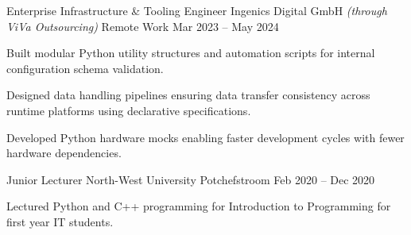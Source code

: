 \begin{cventries}
  \cventry
  {Enterprise Infrastructure \& Tooling Engineer}
  {Ingenics Digital GmbH \emph{(through ViVa Outsourcing)}}
  {Remote Work}
  {Mar 2023 -- May 2024}
  {
    \begin{cvitems}
      \item Built modular Python utility structures and automation scripts for internal configuration schema validation.
      \item Designed data handling pipelines ensuring data transfer consistency across runtime platforms using declarative specifications.
      \item Developed Python hardware mocks enabling faster development cycles with fewer hardware dependencies.
    \end{cvitems}
  }

  \cventry
  {Junior Lecturer}
  {North-West University}
  {Potchefstroom}
  {Feb 2020 -- Dec 2020}
  {
    \begin{cvitems}
      \item Lectured Python and C++ programming for Introduction to Programming for first year IT students. \\
    \end{cvitems}
  }

\end{cventries}
